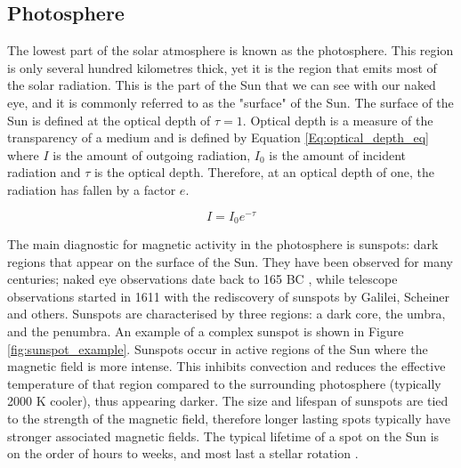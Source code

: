 \subsection{Photosphere}
\label{Chp1_photosphere}

The lowest part of the solar atmosphere is known as the photosphere. This region is only several hundred kilometres thick, yet it is the region that emits most of the solar radiation. This is the part of the Sun that we can see with our naked eye, and it is commonly referred to as the "surface" of the Sun. The surface of the Sun is defined at the optical depth of $\tau = 1$. Optical depth is a measure of the transparency of a medium and is defined by Equation \ref{Eq:optical_depth_eq} where $I$ is the amount of outgoing radiation, $I_{0}$ is the amount of incident radiation and $\tau$ is the optical depth. Therefore, at an optical depth of one, the radiation has fallen by a factor $e$.

\begin{equation}
    I = I_{0}e^{-\tau}
    \label{Eq:optical_depth_eq}
\end{equation}

The main diagnostic for magnetic activity in the photosphere is sunspots: dark regions that appear on the surface of the Sun. They have been observed for many centuries; naked eye observations date back to 165 BC \citep{Wittmann_1987}, while telescope observations started in 1611 with the rediscovery of sunspots by Galilei, Scheiner and others. Sunspots are characterised by three regions: a dark core, the umbra, and the penumbra. An example of a complex sunspot is shown in Figure \ref{fig:sunspot_example}. Sunspots occur in active regions of the Sun where the magnetic field is more intense. This inhibits convection and reduces the effective temperature of that region compared to the surrounding photosphere (typically 2000 K cooler), thus appearing darker. The size and lifespan of sunspots are tied to the strength of the magnetic field, therefore longer lasting spots typically have stronger associated magnetic fields. The typical lifetime of a spot on the Sun is on the order of hours to weeks, and most last a stellar rotation \citep{Bradshaw_Hartigan_2014}.

